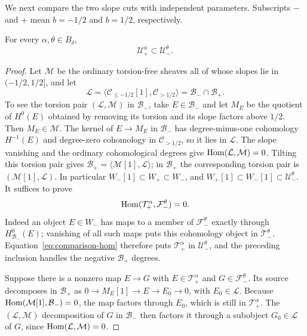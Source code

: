 We next compare the two slope cuts with independent parameters.
Subscripts $-$ and $+$ mean $b=-1/2$ and $b=1/2$, respectively.

\begin{lemma}\label{lem:compare-slope-cuts}
For every $\alpha,\theta\in B_\delta$,
\[
                       \mathcal U_+^\alpha\subset\mathcal U_-^\theta.
\]
\end{lemma}

\begin{proof}
Let $\mathcal M$ be the ordinary torsion-free sheaves all of whose
slopes lie in $(-1/2,1/2]$, and let
\[
 \mathcal L=\langle\mathcal C_{\leq-1/2}[1],\mathcal C_{>1/2}\rangle
             =\mathcal B_-\cap\mathcal B_+.
\]
To see the torsion pair $(\mathcal L,\mathcal M)$ in $\mathcal B_-$,
take $E\in\mathcal B_-$ and let $M_E$ be the quotient of $H^0(E)$
obtained by removing its torsion and its slope factors above $1/2$.
Then $M_E\in\mathcal M$.  The kernel of $E\to M_E$ in
$\mathcal B_-$ has degree-minus-one cohomology $H^{-1}(E)$ and
degree-zero cohomology in $\mathcal C_{>1/2}$, so it lies in
$\mathcal L$.  The slope vanishing and the ordinary cohomological
degrees give $\operatorname{Hom}(\mathcal L,\mathcal M)=0$.
Tilting this torsion pair gives
$\mathcal B_+=\langle\mathcal M[1],\mathcal L\rangle$; in
$\mathcal B_+$ the corresponding torsion pair is
$(\mathcal M[1],\mathcal L)$.  In particular
$W_-[1]\subset W_+\subset W_-$, and
$W_+[1]\subset W_-[1]\subset\mathcal U_-^\theta$.
It suffices to prove
\begin{equation}\label{eq:comparison-hom}
               \operatorname{Hom}(\mathcal T_+^\alpha,\mathcal F_-^\theta)=0.
\end{equation}
Indeed an object $E\in W_-$ has maps to a member of
$\mathcal F_-^\theta$ exactly through $H^0_{\mathcal B_-}(E)$;
vanishing of all such maps puts this cohomology object in
$\mathcal T_-^\theta$.  Equation~\eqref{eq:comparison-hom} therefore
puts $\mathcal T_+^\alpha$ in $\mathcal U_-^\theta$, and the preceding
inclusion handles the negative $\mathcal B_+$ degrees.

Suppose there is a nonzero map $E\to G$ with
$E\in\mathcal T_+^\alpha$ and $G\in\mathcal F_-^\theta$.
Its source decomposes in $\mathcal B_+$ as
$0\to M_E[1]\to E\to E_0\to0$, with $E_0\in\mathcal L$.
Because $\operatorname{Hom}(\mathcal M[1],\mathcal B_-)=0$, the map factors through
$E_0$, which is still in $\mathcal T_+^\alpha$.  The
$(\mathcal L,\mathcal M)$ decomposition of $G$ in $\mathcal B_-$
then factors it through a subobject $G_0\in\mathcal L$ of $G$, since
$\operatorname{Hom}(\mathcal L,\mathcal M)=0$.


\end{proof}
